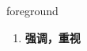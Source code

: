 
\begin{frame}
{\huge foreground}
\begin{center}
\begin{enumerate}\Large
  \item \textbf{强调，重视}
\end{enumerate}
\end{center}
\end{frame}
